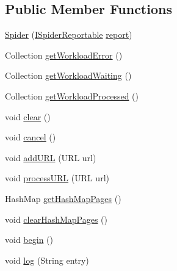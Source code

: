 \subsection*{\-Public \-Member \-Functions}
\begin{DoxyCompactItemize}
\item 
\hyperlink{classcom_1_1spider_1_1jspiderlibrary2_1_1_spider_a1522b55496fac7640ea54b6623d1072f}{\-Spider} (\hyperlink{interfacecom_1_1spider_1_1jspiderlibrary2_1_1_i_spider_reportable}{\-I\-Spider\-Reportable} \hyperlink{classcom_1_1spider_1_1jspiderlibrary2_1_1_spider_a234dbec15186b1bc7750700697ef233b}{report})
\item 
\-Collection \hyperlink{classcom_1_1spider_1_1jspiderlibrary2_1_1_spider_aa2331130fc2e5be2a54b120da24bc348}{get\-Workload\-Error} ()
\item 
\-Collection \hyperlink{classcom_1_1spider_1_1jspiderlibrary2_1_1_spider_a77c4d59ea95fc8c7661b87bbf5da4f86}{get\-Workload\-Waiting} ()
\item 
\-Collection \hyperlink{classcom_1_1spider_1_1jspiderlibrary2_1_1_spider_a6dca4a5d46dcdf9b97bc9cb799ba2c9c}{get\-Workload\-Processed} ()
\item 
void \hyperlink{classcom_1_1spider_1_1jspiderlibrary2_1_1_spider_ae38b2465861c53a4dac6920a32daa2a2}{clear} ()
\item 
void \hyperlink{classcom_1_1spider_1_1jspiderlibrary2_1_1_spider_a9053f35d953c1311c1c98710561b49e4}{cancel} ()
\item 
void \hyperlink{classcom_1_1spider_1_1jspiderlibrary2_1_1_spider_a6c7061bb6b58bdbe6be1a162cf470c85}{add\-U\-R\-L} (\-U\-R\-L url)
\item 
void \hyperlink{classcom_1_1spider_1_1jspiderlibrary2_1_1_spider_aff157f7c46f1ba056dac08797299e0f5}{process\-U\-R\-L} (\-U\-R\-L url)
\item 
\-Hash\-Map \hyperlink{classcom_1_1spider_1_1jspiderlibrary2_1_1_spider_adbf2d01cc0ea713a8c4a8ea9c1cbaf56}{get\-Hash\-Map\-Pages} ()
\item 
void \hyperlink{classcom_1_1spider_1_1jspiderlibrary2_1_1_spider_a472cd53008e1a952f2d8dcfe06f6e744}{clear\-Hash\-Map\-Pages} ()
\item 
void \hyperlink{classcom_1_1spider_1_1jspiderlibrary2_1_1_spider_af82be12bad4bc1e88f494645106ac7e0}{begin} ()
\item 
void \hyperlink{classcom_1_1spider_1_1jspiderlibrary2_1_1_spider_a953b39d3048cc57e3b5a6050a52931fa}{log} (\-String entry)
\end{DoxyCompactItemize}
